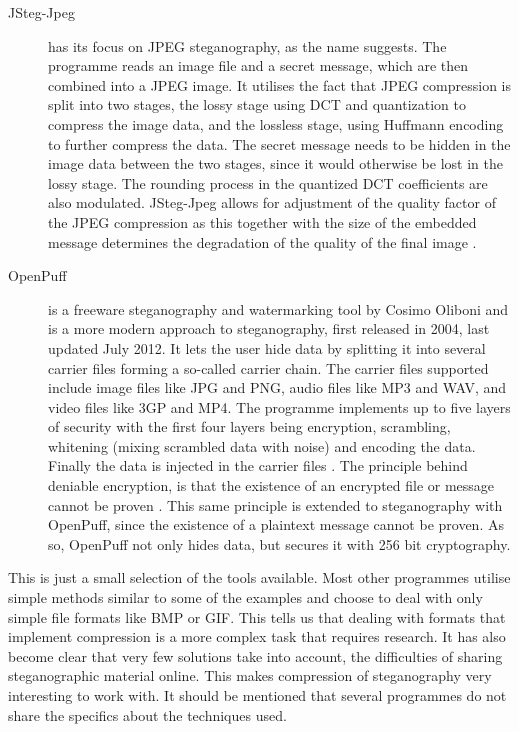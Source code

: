 \begin{description}
	\item[JSteg-Jpeg] has its focus on JPEG steganography, as the name suggests.
	The programme reads an image file and a secret message, which are then combined into a JPEG image. 
	It utilises the fact that JPEG compression is split into two stages, the lossy stage using DCT and quantization to compress the image data, and the			lossless stage, using Huffmann encoding to further compress the data.
	The secret message needs to be hidden in the image data between the two stages, since it would otherwise be lost in the lossy stage.
	The rounding process in the quantized DCT coefficients are also modulated. 
	JSteg-Jpeg allows for adjustment of the quality factor of the JPEG compression as this together with the size of the embedded message determines the 		degradation of the quality of the final image \citep{ImageProcessingFrankY}.
	
	\item[OpenPuff] is a freeware steganography and watermarking tool by Cosimo Oliboni and is a more modern approach to steganography, first released in 		2004, last updated July 2012. 
	It lets the user hide data by splitting it into several carrier files forming a so-called carrier chain. 
	The carrier files supported include image files like JPG and PNG, audio files like MP3 and WAV, and video files like 3GP and MP4.
	The programme implements up to five layers of security with the first four layers being encryption, scrambling, whitening (mixing scrambled data 			with noise) and encoding the data. 
	Finally the data is injected in the carrier files \citep{Oliboni2012}.
	The principle behind deniable encryption, is that the existence of an encrypted file or message cannot be proven \citep{Schneier2008}.
	This same principle is extended to steganography with OpenPuff, since the existence of a plaintext message cannot be proven.
	As so, OpenPuff not only hides data, but secures it with 256 bit cryptography.
\end{description}

This is just a small selection of the tools available. 
Most other programmes utilise simple methods similar to some of the examples and choose to deal with only simple file formats like BMP or GIF.
This tells us that dealing with formats that implement compression is a more complex task that requires research.
It has also become clear that very few solutions take into account, the difficulties of sharing steganographic material online.
This makes compression of steganography very interesting to work with. 
It should be mentioned that several programmes do not share the specifics about the techniques used.
